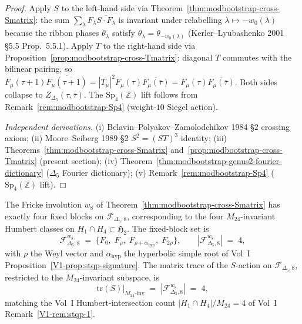 \begin{proof}
Apply $S$ to the left-hand side via
Theorem~\ref{thm:modbootstrap-cross-Smatrix}: the sum
$\sum_\lambda F_\lambda\overline{S\cdot F_\lambda}$ is
invariant under relabelling
$\lambda\mapsto -w_0(\lambda)$ because the ribbon phases
$\theta_\lambda$ satisfy $\theta_\lambda = \theta_{-w_0(\lambda)}$
(Kerler--Lyubashenko 2001 \S 5.5 Prop.~5.5.1). Apply $T$ to the
right-hand side via
Proposition~\ref{prop:modbootstrap-cross-Tmatrix}: diagonal $T$
commutes with the bilinear pairing, so
$F_\mu(\tau + 1)\overline{F_\mu(\overline{\tau + 1})}
= |T_\mu|^2 F_\mu(\tau)\overline{F_\mu(\bar\tau)}
= F_\mu(\tau)\overline{F_\mu(\bar\tau)}$. Both sides collapse to
$Z_{\Delta_5}(\tau,\bar\tau)$. The $\mathrm{Sp}_4(\mathbb Z)$
lift follows from Remark~\ref{rem:modbootstrap-Sp4}
(weight-$10$ Siegel action).

\emph{Independent derivations.}
(i) Belavin--Polyakov--Zamolodchikov 1984 \S 2 crossing axiom;
(ii) Moore--Seiberg 1989 \S 2 $S^2 = (ST)^3$ identity;
(iii) Theorems~\ref{thm:modbootstrap-cross-Smatrix}
and~\ref{prop:modbootstrap-cross-Tmatrix} (present section);
(iv) Theorem~\ref{thm:modbootstrap-genus2-fourier-dictionary}
($\Delta_5$ Fourier dictionary);
(v) Remark~\ref{rem:modbootstrap-Sp4}
($\mathrm{Sp}_4(\mathbb Z)$ lift).
\end{proof}

\begin{theorem}
\label{thm:modbootstrap-cross-four-fricke-fixed}
\ClaimStatusConditional
{}
The Fricke involution $w_8$ of
Theorem~\ref{thm:modbootstrap-cross-Smatrix} has exactly four
fixed blocks on $\mathcal F_{\Delta_5, 8}$, corresponding to
the four $M_{24}$-invariant Humbert classes on
$H_1\cap H_4\subset\mathfrak H_2$. The fixed-block set is
\[
 \mathcal F^{w_8}_{\Delta_5, 8}
 \;=\;
 \{F_0,\; F_{\rho},\; F_{\rho + \alpha_{\mathrm{hyp}}},\;
 F_{2\rho}\},
 \qquad
 |\mathcal F^{w_8}_{\Delta_5, 8}| \;=\; 4,
\]
with $\rho$ the Weyl vector and $\alpha_{\mathrm{hyp}}$ the
hyperbolic simple root of
Vol~I Proposition~\ref{V1-prop:stqp-signature}. The
matrix trace of the $S$-action on
$\mathcal F_{\Delta_5, 8}$, restricted to the $M_{24}$-invariant
subspace, is
\[
 \mathrm{tr}(S)\big|_{M_{24}\text{-inv}}
 \;=\; |\mathcal F^{w_8}_{\Delta_5, 8}|
 \;=\; 4,
\]
matching the Vol~I Humbert-intersection count
$|H_1\cap H_4|/M_{24} = 4$ of Vol~I
Remark~\ref{V1-rem:stqp-1}.
\end{theorem}

